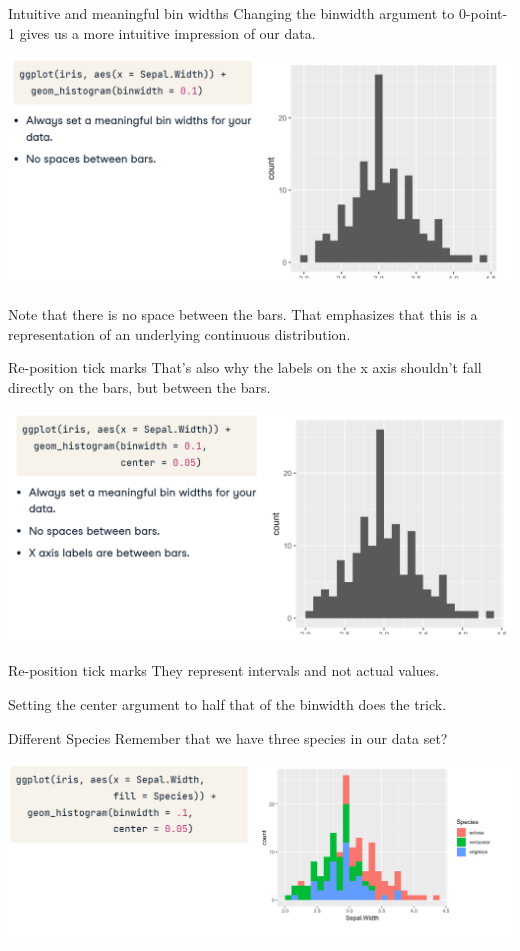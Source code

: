 \documentclass[
  ignorenonframetext,
]{beamer}
\begin{document}
\begin{frame}{Intuitive and meaningful bin widths}
\label{intuitive-and-meaningful-bin-widths}
Changing the binwidth argument to 0-point-1 gives us a more intuitive
impression of our data.

\includegraphics{../images/im201.png}

Note that there is no space between the bars. That emphasizes that this
is a representation of an underlying continuous distribution.
\end{frame}

\begin{frame}{Re-position tick marks}
\label{re-position-tick-marks}
That's also why the labels on the x axis shouldn't fall directly on the
bars, but between the bars.

\includegraphics{../images/im202.png}
\end{frame}

\begin{frame}{Re-position tick marks}
\label{re-position-tick-marks-1}
They represent intervals and not actual values.

Setting the center argument to half that of the binwidth does the trick.
\end{frame}

\begin{frame}{Different Species}
\label{different-species}
Remember that we have three species in our data set?

\includegraphics{../images/im203.png}
\end{frame}
\end{document}
